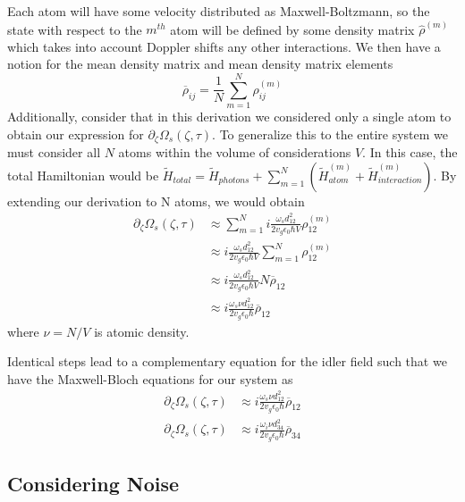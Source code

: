 \documentclass[aps,pra,showpacs,amsmath,amssymb,nofootinbib,longbibliography,superscriptaddress
]{revtex4-1}
\theoremstyle{definition}
\theoremstyle{remark}
\newcommand{\0}{\hat{0}}
\begin{document}
Each atom will have some velocity distributed as Maxwell-Boltzmann, so the state with respect to the $m^{th}$ atom will be defined by some density matrix $\hat{\rho}^{(m)}$ which takes into account Doppler shifts any other interactions. We then have a notion for the mean density matrix and mean density matrix elements
\begin{equation}
    \overline{\rho}_{ij} = \frac{1}{N} \sum_{m=1}^N \rho_{ij}^{(m)}
\end{equation}
Additionally, consider that in this derivation we considered only a single atom to obtain our expression for $\partial_\zeta \Omega_s(\zeta, \tau)$. To generalize this to the entire system we must consider all $N$ atoms within the volume of considerations $V$. In this case, the total Hamiltonian would be $\tilde{H}_{total} = \tilde{H}_{photons} + \sum_{m=1}^{N} \left(\tilde{H}^{(m)}_{atom} + \tilde{H}^{(m)}_{interaction}\right)$. By extending our derivation to N atoms, we would obtain
\begin{align}
    \partial_\zeta \Omega_s(\zeta, \tau)
    &\approx
    \sum_{m=1}^N i \frac{\omega_s d_{12}^2}{2 v_g \epsilon_0 \hbar V } \rho_{12}^{(m)} \nonumber \\
    &\approx
    i \frac{\omega_s d_{12}^2}{2 v_g \epsilon_0 \hbar V } \sum_{m=1}^N \rho_{12}^{(m)} \nonumber \\
    &\approx
    i \frac{\omega_s d_{12}^2}{2 v_g \epsilon_0 \hbar V } N \overline{\rho}_{12} \nonumber \\
    &\approx
    i \frac{\omega_s \nu d_{12}^2}{2 v_g \epsilon_0 \hbar } \overline{\rho}_{12}
\end{align}
where $\nu = N/V$ is atomic density.

Identical steps lead to a complementary equation for the idler field such that we have the Maxwell-Bloch equations for our system as
\begin{align}\label{MaxwellBlochForSystem}
    \partial_\zeta \Omega_s(\zeta, \tau)
    &\approx
    i \frac{\omega_s \nu d_{12}^2}{2 v_g \epsilon_0 \hbar } \overline{\rho}_{12} \\
    \partial_\zeta \Omega_s(\zeta, \tau)
    &\approx
    i \frac{\omega_i \nu d_{34}^2}{2 v_g \epsilon_0 \hbar } \overline{\rho}_{34}
\end{align}

\subsection{Considering Noise}
\end{document}
